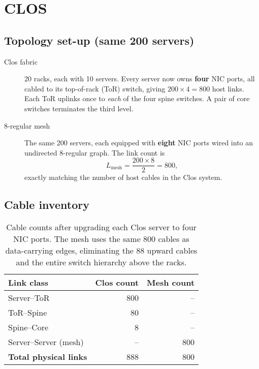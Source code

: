 \documentclass[../../../OAE-SPEC-MAIN.tex]{subfiles}
\begin{document}
\section{CLOS}
\subsection{Topology set-up (same 200 servers)}
\begin{description}
  \item[Clos fabric] 20 racks, each with 10 servers. %
        Every server now owns \textbf{four} NIC ports, all cabled to its
        top-of-rack (ToR) switch, giving $200 \times 4 = 800$ host links. %
        Each ToR uplinks once to \emph{each} of the four spine switches. %
        A pair of core switches terminates the third level.
  \item[$8$-regular mesh] The same 200 servers, each equipped with
        \textbf{eight} NIC ports wired into an undirected
        $8$-regular graph. %
        The link count is
        \[
           L_{\text{mesh}} = \frac{200 \times 8}{2} = 800,
        \]
        exactly matching the number of host cables in the Clos system.
\end{description}
\subsection{Cable inventory}
\begin{table}[h]
\centering
\begin{tabular}{@{}lrr@{}}
\toprule
Link class & Clos count & Mesh count \\
\midrule
Server--ToR                       & 800 & --  \\
ToR--Spine                        &  80 & --  \\
Spine--Core                       &   8 & --  \\
Server--Server (mesh)             & --  & 800 \\[2pt]
\textbf{Total physical links}     & 888 & 800 \\
\bottomrule
\end{tabular}
\caption{Cable counts after upgrading each Clos server to four NIC ports. The mesh uses the same 800 cables as data-carrying edges, eliminating the 88 upward cables and the entire switch hierarchy above the racks.}
\end{table}
\end{document}

